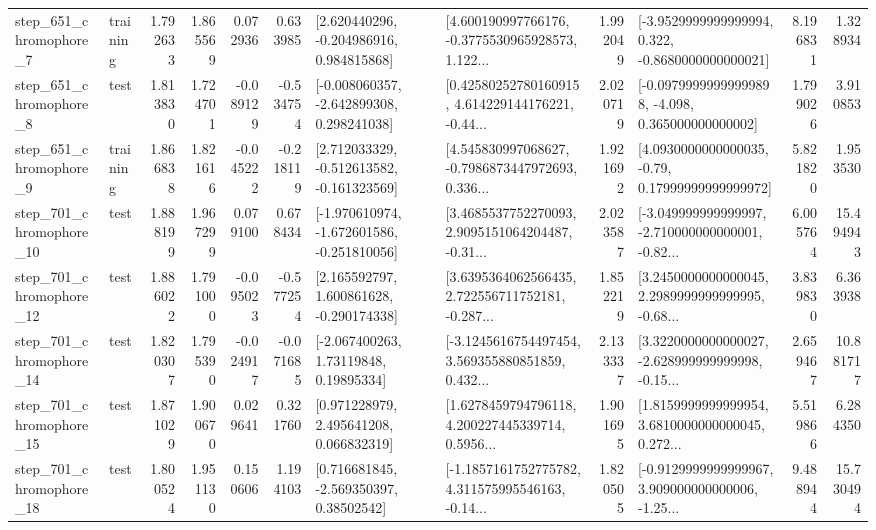 \begin{tabular}{llrrrrllrlrr}
   step\_651\_chromophore\_7 &  training &      1.792633 &    1.865569 &      0.072936 &  0.633985 &    [2.620440296, -0.204986916, 0.984815868] &  [4.600190997766176, -0.3775530965928573, 1.122... &       1.992049 &  [-3.9529999999999994, 0.322, -0.8680000000000021] &            8.196831 &          1.328934 \\
   step\_651\_chromophore\_8 &      test &      1.813830 &    1.724701 &     -0.089129 & -0.534754 &   [-0.008060357, -2.642899308, 0.298241038] &  [0.42580252780160915, 4.614229144176221, -0.44... &       2.020719 &  [-0.09799999999999898, -4.098, 0.365000000000002] &            1.799026 &          3.910853 \\
   step\_651\_chromophore\_9 &  training &      1.866838 &    1.821616 &     -0.045222 & -0.218119 &   [2.712033329, -0.512613582, -0.161323569] &  [4.545830997068627, -0.7986873447972693, 0.336... &       1.921692 &   [4.0930000000000035, -0.79, 0.17999999999999972] &            5.821820 &          1.953530 \\
  step\_701\_chromophore\_10 &      test &      1.888199 &    1.967299 &      0.079100 &  0.678434 &  [-1.970610974, -1.672601586, -0.251810056] &  [3.4685537752270093, 2.9095151064204487, -0.31... &       2.023587 &  [-3.049999999999997, -2.710000000000001, -0.82... &            6.005764 &         15.494943 \\
  step\_701\_chromophore\_12 &      test &      1.886022 &    1.791000 &     -0.095023 & -0.577254 &    [2.165592797, 1.600861628, -0.290174338] &  [3.6395364062566435, 2.722556711752181, -0.287... &       1.852219 &  [3.2450000000000045, 2.2989999999999995, -0.68... &            3.839830 &          6.363938 \\
  step\_701\_chromophore\_14 &      test &      1.820307 &    1.795390 &     -0.024917 & -0.071685 &      [-2.067400263, 1.73119848, 0.19895334] &  [-3.1245616754497454, 3.569355880851859, 0.432... &       2.133337 &  [3.3220000000000027, -2.628999999999998, -0.15... &            2.659467 &         10.881717 \\
  step\_701\_chromophore\_15 &      test &      1.871029 &    1.900670 &      0.029641 &  0.321760 &     [0.971228979, 2.495641208, 0.066832319] &  [1.6278459794796118, 4.200227445339714, 0.5956... &       1.901695 &  [1.8159999999999954, 3.6810000000000045, 0.272... &            5.519866 &          6.284350 \\
  step\_701\_chromophore\_18 &      test &      1.800524 &    1.951130 &      0.150606 &  1.194103 &     [0.716681845, -2.569350397, 0.38502542] &  [-1.1857161752775782, 4.311575995546163, -0.14... &       1.820505 &  [-0.9129999999999967, 3.909000000000006, -1.25... &            9.488944 &         15.730494 \\

\end{tabular}
